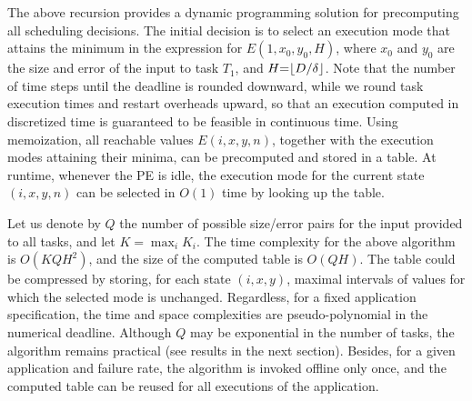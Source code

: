 The above recursion provides a dynamic programming solution for
precomputing all scheduling decisions.  The initial decision is to select
an execution mode that attains the minimum in the expression for $E(1,x_0, y_0,
H)$, where $x_0$ and $y_0$ are the size and error of the input to task
$T_1$, and $H{=}\lfloor D/\delta \rfloor$.  Note that the number of time
steps until the deadline is rounded downward, while we round task execution
times and restart overheads upward, so that an execution computed in
discretized time is guaranteed to be feasible in continuous time.  Using
memoization, all reachable values $E(i, x, y, n)$, together with the
execution modes attaining their minima, can be precomputed and stored in a
table.  At runtime, whenever the PE is idle, the execution mode for the
current state $(i, x, y, n)$ can be selected in $O(1)$ time by looking up
the table.

Let us denote by $Q$ the number of possible size/error pairs for the input
provided to all tasks, and let $K{=}\max_i K_i$. The time complexity for
the above algorithm is $O(KQH^2)$, and the size of the computed table is
$O(QH)$. The table could be compressed by storing, for each state $(i,x,y)$,
maximal intervals of values for which
the selected mode is unchanged.  Regardless, for a fixed application
specification, the time and space complexities are pseudo-polynomial in
the numerical deadline.  Although $Q$ may be exponential in the number of
tasks, the algorithm remains practical (see results in the next section).
Besides, for a given application and failure rate, the algorithm is
invoked offline only once, and the computed table can be reused for all
executions of the application.




